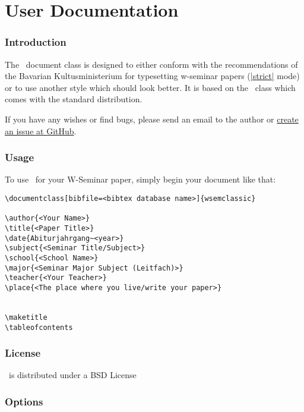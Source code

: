 \part{User Documentation}


\section{Introduction}

The \wsemclassic\ document class is designed to either conform with the
recommendations of the Bavarian Kultusministerium for typesetting
w-seminar papers (\hyperlink{udoc.opt.strict}{|strict|} mode) or to use another
style which should look better. It is based on the \report\ class which
comes with the standard  distribution.

If you have any wishes or find bugs, please send an email to the author or
\href{https://github.com/jorsn/wsemclassic/issues}{create an issue at GitHub}.


\section{Usage}

To use \wsemclassic\ for your W-Seminar paper, simply begin your 
document like that:

\begin{verbatim}
\documentclass[bibfile=<bibtex database name>]{wsemclassic}

\author{<Your Name>}
\title{<Paper Title>}
\date{Abiturjahrgang~<year>}
\subject{<Seminar Title/Subject>}
\school{<School Name>}
\major{<Seminar Major Subject (Leitfach)>}
\teacher{<Your Teacher>}
\place{<The place where you live/write your paper>}


\maketitle
\tableofcontents
\end{verbatim}


\section{License}

\wsemclassic\ is distributed under a BSD License

\hypertarget{sec.options}{\section{Options}}

